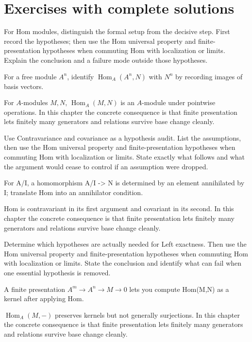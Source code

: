 \section{Exercises with complete solutions}

\begin{exercise}\label{exr:v12-01}
For Hom modules, distinguish the formal setup from the decisive step. First record the hypotheses; then use the Hom universal property and finite-presentation hypotheses when commuting Hom with localization or limits. Explain the conclusion and a failure mode outside those hypotheses.
\end{exercise}
\begin{hint}
For a free module \(A^n\), identify \(\operatorname{Hom}_A(A^n,N)\) with \(N^n\) by recording images of basis vectors.
\end{hint}
\begin{solution}
For $A$-modules $M,N$, $\operatorname{Hom}_A(M,N)$ is an $A$-module under pointwise operations. In this chapter the concrete consequence is that finite presentation lets finitely many generators and relations survive base change cleanly.
\end{solution}

\begin{exercise}\label{exr:v12-02}
Use Contravariance and covariance as a hypothesis audit. List the assumptions, then use the Hom universal property and finite-presentation hypotheses when commuting Hom with localization or limits. State exactly what follows and what the argument would cease to control if an assumption were dropped.
\end{exercise}
\begin{hint}
For A/I, a homomorphism A/I -> N is determined by an element annihilated by I; translate Hom into an annihilator condition.
\end{hint}
\begin{solution}
Hom is contravariant in its first argument and covariant in its second. In this chapter the concrete consequence is that finite presentation lets finitely many generators and relations survive base change cleanly.
\end{solution}

\begin{exercise}\label{exr:v12-03}
Determine which hypotheses are actually needed for Left exactness. Then use the Hom universal property and finite-presentation hypotheses when commuting Hom with localization or limits. State the conclusion and identify what can fail when one essential hypothesis is removed.
\end{exercise}
\begin{hint}
A finite presentation \(A^m\to A^n\to M\to0\) lets you compute Hom(M,N) as a kernel after applying Hom.
\end{hint}
\begin{solution}
$\operatorname{Hom}_A(M,-)$ preserves kernels but not generally surjections. In this chapter the concrete consequence is that finite presentation lets finitely many generators and relations survive base change cleanly.
\end{solution}

